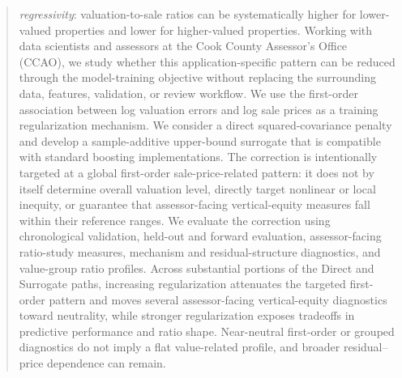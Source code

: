 \documentclass[10pt]{article}
\theoremstyle{definition}
\newcommand{\1}{\mathbf{1}}
\newcommand{\oldtext}[1]{\textcolor{blue}{\sout{#1}}}
\newcommand{\newtext}[1]{\textcolor{impGreen}{#1}}
\begin{document}
\begin{abstract}
\emph{regressivity}: valuation-to-sale ratios can be systematically higher for lower-valued properties and lower for higher-valued properties.
Working with data scientists and assessors at the Cook County Assessor's Office (CCAO), we study whether this application-specific pattern can be reduced through the model-training objective without replacing the surrounding data, features, validation, or review workflow. We use the first-order association between log valuation errors and log sale prices as a training regularization mechanism. We consider a direct squared-covariance penalty and develop a sample-additive upper-bound surrogate that is compatible with standard boosting implementations. 
\newtext{The correction is intentionally targeted at a global first-order sale-price-related pattern: it does not by itself determine overall valuation level, directly target nonlinear or local inequity, or guarantee that assessor-facing vertical-equity measures fall within their reference ranges.} 
\newtext{We evaluate the correction using chronological validation, held-out and forward evaluation, assessor-facing ratio-study measures, mechanism and residual-structure diagnostics, and value-group ratio profiles.} 
\newtext{Across substantial portions of the Direct and Surrogate paths, increasing regularization attenuates the targeted first-order pattern and moves several assessor-facing vertical-equity diagnostics toward neutrality, while stronger regularization exposes tradeoffs in predictive performance and ratio shape. Near-neutral first-order or grouped diagnostics do not imply a flat value-related profile, and broader residual--price dependence can remain.}

\end{abstract}
\end{document}
